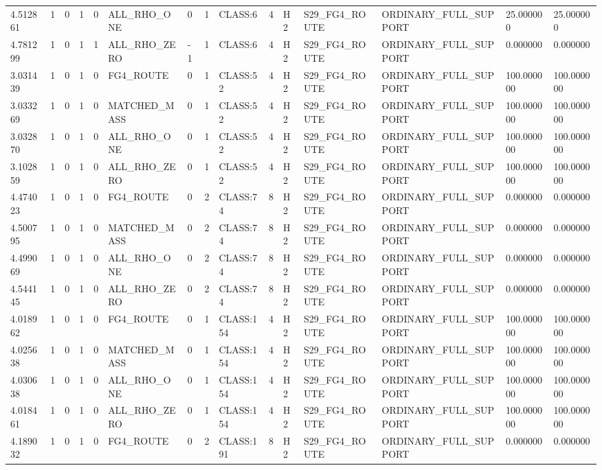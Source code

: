\begin{tabular}{lllllllllllllll}
4.512861 & 1 & 0 & 1 & 0 & ALL\_RHO\_ONE & 0 & 1 & CLASS:6 & 4 & H2 & S29\_FG4\_ROUTE & ORDINARY\_FULL\_SUPPORT & 25.000000 & 25.000000 \\
4.781299 & 1 & 0 & 1 & 1 & ALL\_RHO\_ZERO & -1 & 1 & CLASS:6 & 4 & H2 & S29\_FG4\_ROUTE & ORDINARY\_FULL\_SUPPORT & 0.000000 & 0.000000 \\
3.031439 & 1 & 0 & 1 & 0 & FG4\_ROUTE & 0 & 1 & CLASS:52 & 4 & H2 & S29\_FG4\_ROUTE & ORDINARY\_FULL\_SUPPORT & 100.000000 & 100.000000 \\
3.033269 & 1 & 0 & 1 & 0 & MATCHED\_MASS & 0 & 1 & CLASS:52 & 4 & H2 & S29\_FG4\_ROUTE & ORDINARY\_FULL\_SUPPORT & 100.000000 & 100.000000 \\
3.032870 & 1 & 0 & 1 & 0 & ALL\_RHO\_ONE & 0 & 1 & CLASS:52 & 4 & H2 & S29\_FG4\_ROUTE & ORDINARY\_FULL\_SUPPORT & 100.000000 & 100.000000 \\
3.102859 & 1 & 0 & 1 & 0 & ALL\_RHO\_ZERO & 0 & 1 & CLASS:52 & 4 & H2 & S29\_FG4\_ROUTE & ORDINARY\_FULL\_SUPPORT & 100.000000 & 100.000000 \\
4.474023 & 1 & 0 & 1 & 0 & FG4\_ROUTE & 0 & 2 & CLASS:74 & 8 & H2 & S29\_FG4\_ROUTE & ORDINARY\_FULL\_SUPPORT & 0.000000 & 0.000000 \\
4.500795 & 1 & 0 & 1 & 0 & MATCHED\_MASS & 0 & 2 & CLASS:74 & 8 & H2 & S29\_FG4\_ROUTE & ORDINARY\_FULL\_SUPPORT & 0.000000 & 0.000000 \\
4.499069 & 1 & 0 & 1 & 0 & ALL\_RHO\_ONE & 0 & 2 & CLASS:74 & 8 & H2 & S29\_FG4\_ROUTE & ORDINARY\_FULL\_SUPPORT & 0.000000 & 0.000000 \\
4.544145 & 1 & 0 & 1 & 0 & ALL\_RHO\_ZERO & 0 & 2 & CLASS:74 & 8 & H2 & S29\_FG4\_ROUTE & ORDINARY\_FULL\_SUPPORT & 0.000000 & 0.000000 \\
4.018962 & 1 & 0 & 1 & 0 & FG4\_ROUTE & 0 & 1 & CLASS:154 & 4 & H2 & S29\_FG4\_ROUTE & ORDINARY\_FULL\_SUPPORT & 100.000000 & 100.000000 \\
4.025638 & 1 & 0 & 1 & 0 & MATCHED\_MASS & 0 & 1 & CLASS:154 & 4 & H2 & S29\_FG4\_ROUTE & ORDINARY\_FULL\_SUPPORT & 100.000000 & 100.000000 \\
4.030638 & 1 & 0 & 1 & 0 & ALL\_RHO\_ONE & 0 & 1 & CLASS:154 & 4 & H2 & S29\_FG4\_ROUTE & ORDINARY\_FULL\_SUPPORT & 100.000000 & 100.000000 \\
4.018461 & 1 & 0 & 1 & 0 & ALL\_RHO\_ZERO & 0 & 1 & CLASS:154 & 4 & H2 & S29\_FG4\_ROUTE & ORDINARY\_FULL\_SUPPORT & 100.000000 & 100.000000 \\
4.189032 & 1 & 0 & 1 & 0 & FG4\_ROUTE & 0 & 2 & CLASS:191 & 8 & H2 & S29\_FG4\_ROUTE & ORDINARY\_FULL\_SUPPORT & 0.000000 & 0.000000 \\

\end{tabular}
